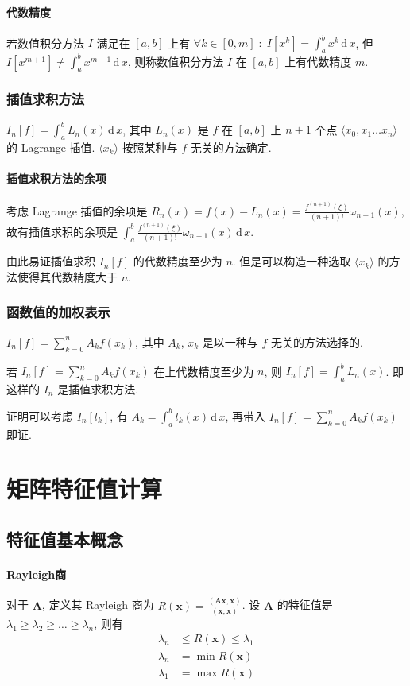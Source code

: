 \documentclass{ctexart}
\newcommand{\ud}{\,\mathrm{d}\,}
\begin{document}
\paragraph{代数精度}
    若数值积分方法 $I$ 满足在 $[a,b]$ 上有
    $\forall k \in [0, m]\;:\; I[x^k] = \int_a^b x^k \ud x$,
    但 $I[x^{m+1}] \neq \int_a^b x^{m+1} \ud x$,
    则称数值积分方法 $I$ 在 $[a,b]$ 上有代数精度 $m$.
\subsubsection{插值求积方法}
    $I_n[f] = \int_a^b L_n(x) \ud x$,
    其中 $L_n(x)$ 是 $f$ 在 $[a,b]$ 上 $n+1$ 个点
    $\langle x_0, x_1 \ldots x_n \rangle$ 的 Lagrange 插值.
    $\langle x_k \rangle$ 按照某种与 $f$ 无关的方法确定.
\paragraph{插值求积方法的余项}
    考虑 Lagrange 插值的余项是
    $R_n(x) = f(x) - L_n(x) =
        \frac{f^{(n+1)}(\xi)}{(n+1)!} \omega_{n+1}(x)$,
    故有插值求积的余项是
    $\int_a^b \frac{f^{(n+1)}(\xi)}{(n+1)!} \omega_{n+1}(x) \ud x$.\par
    由此易证插值求积 $I_n[f]$ 的代数精度至少为 $n$.
    但是可以构造一种选取 $\langle x_k \rangle$
    的方法使得其代数精度大于 $n$.
\subsubsection{函数值的加权表示}
    $I_n[f] = \sum_{k = 0}^n A_k f(x_k)$,
    其中 $A_k$, $x_k$ 是以一种与 $f$ 无关的方法选择的.\par
    若 $I_n[f] = \sum_{k=0}^n A_k f(x_k)$ 在上代数精度至少为 $n$,
    则 $I_n[f] = \int_a^b L_n(x)$. 即这样的 $I_n$ 是插值求积方法.\par
    证明可以考虑 $I_n[l_k]$, 有 $A_k = \int_a^b l_k(x) \ud x$,
    再带入 $I_n[f] = \sum_{k=0}^n A_k f(x_k)$ 即证.


\section{矩阵特征值计算}
\subsection{特征值基本概念}
\paragraph{Rayleigh商}
    对于 $\mathbf{A}$, 定义其 Rayleigh 商为
    $R(\mathbf{x}) = \frac{(\mathbf{A} \mathbf{x} , \mathbf{x} )}{(\mathbf{x} ,\mathbf{x} )}$.
    设 $\mathbf{A}$ 的特征值是 $\lambda_1 \ge \lambda_2 \ge \ldots \ge \lambda_n$,
    则有 \begin{align*}
        \lambda_n &\le R(\mathbf{x} ) \le \lambda_1 \\
        \lambda_n &= \min R(\mathbf{x})\\
        \lambda_1 &= \max R(\mathbf{x})
    \end{align*}
\end{document}
